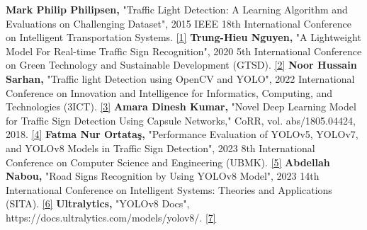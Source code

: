 \documentclass[12 pt]{report}
\begin{document}
\begin{justify}
  \textbf{Mark Philip Philipsen,} "Traffic Light Detection: A Learning Algorithm and Evaluations on Challenging Dataset", 2015 IEEE 18th International Conference on Intelligent Transportation Systems.
  \href{https://doi.org/10.1109/ITSC.2015.378}{[1]}\newline
  \textbf{Trung-Hieu Nguyen,} "A Lightweight Model For Real-time Traffic Sign Recognition", 2020 5th International Conference on Green Technology and Sustainable Development (GTSD).
  \href{https://doi.org/10.1109/GTSD50082.2020.9303072}{[2]}\newline
  \textbf{Noor Hussain Sarhan,} "Traffic light Detection using OpenCV and YOLO", 2022 International Conference on Innovation and Intelligence for Informatics, Computing, and Technologies (3ICT).
  \href{https://doi.org/10.1109/3ICT56508.2022.9990723}{[3]}\newline
  \textbf{Amara Dinesh Kumar,} "Novel Deep Learning Model for Traffic Sign Detection Using Capsule Networks," CoRR, vol. abs/1805.04424, 2018.
  \href{https://doi.org/10.48550/arXiv.1805.04424}{[4]}\newline
  \textbf{Fatma Nur Ortataş,} "Performance Evaluation of YOLOv5, YOLOv7, and YOLOv8 Models in Traffic Sign Detection", 2023 8th International Conference on Computer Science and Engineering (UBMK).
  \href{https://doi.org/10.1109/UBMK59864.2023.10286611}{[5]}\newline
  \textbf{Abdellah Nabou,} "Road Signs Recognition by Using YOLOv8 Model", 2023 14th International Conference on Intelligent Systems: Theories and Applications (SITA).
  \href{https://ieeexplore.ieee.org/document/10373723}{[6]}\newline
  \textbf{Ultralytics,} "YOLOv8 Docs", https://docs.ultralytics.com/models/yolov8/.
  \href{https://www.ros.org/}{[7]}
\end{justify}
\end{document}
